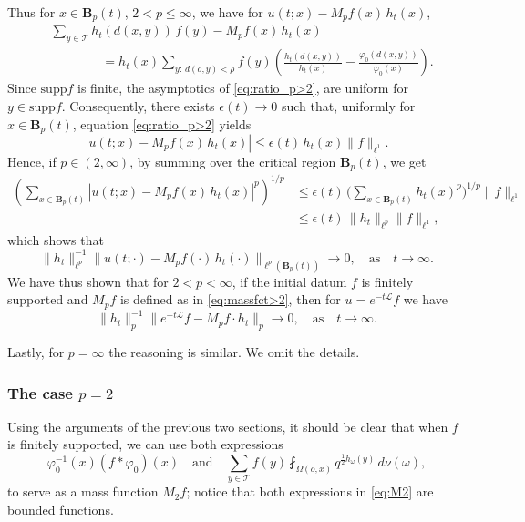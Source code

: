 \documentclass[11pt,a4paper,reqno]{amsart}
\renewcommand\mathcal{\mathscr}
\theoremstyle{plain}
\theoremstyle{remark}
\theoremstyle{definition}
\theoremstyle{remark}
\numberwithin{equation}{section}
\newcommand\supp{\mathrm{supp}}
\begin{document}
	
	Thus for $x\in \textbf{B}_p(t)$, $2<p\leq \infty$, we have for $u(t;x)-M_pf(x)\,h_t(x)$,
	\begin{align*}
		&\sum_{y\in \mathcal{T}} h_t(d(x,y))\,f(y) - M_pf(x)\, h_t(x) \\
		&\qquad\qquad=
		h_t(x)
		\sum_{y:\,  d(o,y)< \rho} f(y) 
		\left( \frac{h_t(d(x,y))}{h_t(x)} -  \frac{\varphi_0(d(x,y))}{\varphi_0(x)} \right).
	\end{align*}
Since $\supp f$ is finite, the asymptotics of  \eqref{eq:ratio_p>2}, are uniform for $y \in \supp f$.
Consequently, there exists $\epsilon(t) \to 0$ such that, uniformly for $x\in \textbf{B}_p(t)$,  equation \eqref{eq:ratio_p>2} yields
	\[
	|u(t; x) - M_pf(x)\, h_t(x)|
	\leq \epsilon(t)\,
	h_t(x) \|f\|_{\ell^1}.
	\]
	Hence,  if $p \in (2, \infty)$, by summing over the critical region $\textbf{B}_p(t)$, we get
\begin{align*}
	\left(	\sum_{x \in \textbf{B}_p(t)}
	\left|u(t; x) - M_pf(x)\, h_t(x)\right|^p \right)^{1/p}&\leq \epsilon(t)\,
	\bigg(\sum_{x \in \textbf{B}_p(t)} h_t(x)^p\bigg)^{1/p} \|f\|_{\ell^1} \\
	&\leq \epsilon(t)\,
	\|h_t\|_{\ell^p} \|f\|_{\ell^1},
	\end{align*}
	which shows that
	\[
	\|h_t\|_{\ell^p}^{-1}\|u(t; \cdot)-M_pf(\cdot)\, h_t(\cdot)\|_{\ell^p(\textbf{B}_p(t))}\to 0, \quad \text{as} \quad t\to \infty.
	\]
	We have thus shown that for $2<p< \infty$, if the initial datum $f$ is finitely supported and $M_pf$ is defined as in \eqref{eq:massfct>2}, then for  $u=e^{-t\mathcal{L}}f$ we have
	\[
	\|h_t\|_{p}^{-1}\|e^{-t\mathcal{L}}f-M_pf\cdot h_t\|_{p}\to 0, \quad \text{as} \quad t\to \infty.
	\]
	
    Lastly, for $p = \infty$ the reasoning is similar. We omit the details.
	
	\subsubsection{The case $p=2$} Using the arguments of the previous two sections, it should be clear that when $f$ is finitely supported, we can use both expressions 
    \begin{equation}\label{eq:M2}
    \varphi_0^{-1}(x)(f\ast\varphi_0)(x) \quad  \text{and}  \quad \sum_{y\in \mathcal{T}}f(y)\fint_{\Omega(o,x)}q^{\frac{1}{2}h_{\omega}(y)}\, 
	d\nu(\omega),
    \end{equation}
    to serve as a mass function $M_2f$; notice that both expressions in \eqref{eq:M2} are bounded functions. 
\end{document}
